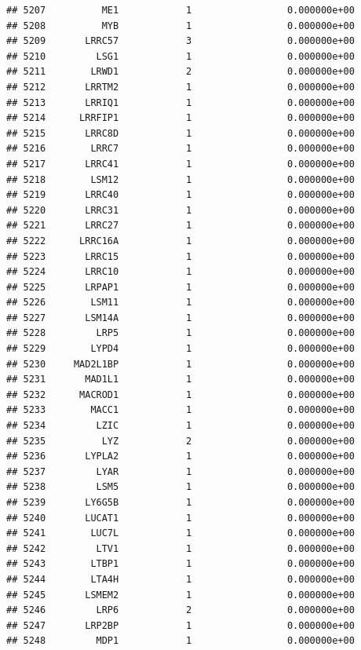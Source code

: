 \documentclass[
]{article}
\begin{document}
\begin{verbatim}
## 5207          ME1            1                 0.000000e+00
## 5208          MYB            1                 0.000000e+00
## 5209       LRRC57            3                 0.000000e+00
## 5210         LSG1            1                 0.000000e+00
## 5211        LRWD1            2                 0.000000e+00
## 5212       LRRTM2            1                 0.000000e+00
## 5213       LRRIQ1            1                 0.000000e+00
## 5214      LRRFIP1            1                 0.000000e+00
## 5215       LRRC8D            1                 0.000000e+00
## 5216        LRRC7            1                 0.000000e+00
## 5217       LRRC41            1                 0.000000e+00
## 5218        LSM12            1                 0.000000e+00
## 5219       LRRC40            1                 0.000000e+00
## 5220       LRRC31            1                 0.000000e+00
## 5221       LRRC27            1                 0.000000e+00
## 5222      LRRC16A            1                 0.000000e+00
## 5223       LRRC15            1                 0.000000e+00
## 5224       LRRC10            1                 0.000000e+00
## 5225       LRPAP1            1                 0.000000e+00
## 5226        LSM11            1                 0.000000e+00
## 5227       LSM14A            1                 0.000000e+00
## 5228         LRP5            1                 0.000000e+00
## 5229        LYPD4            1                 0.000000e+00
## 5230     MAD2L1BP            1                 0.000000e+00
## 5231       MAD1L1            1                 0.000000e+00
## 5232      MACROD1            1                 0.000000e+00
## 5233        MACC1            1                 0.000000e+00
## 5234         LZIC            1                 0.000000e+00
## 5235          LYZ            2                 0.000000e+00
## 5236       LYPLA2            1                 0.000000e+00
## 5237         LYAR            1                 0.000000e+00
## 5238         LSM5            1                 0.000000e+00
## 5239       LY6G5B            1                 0.000000e+00
## 5240       LUCAT1            1                 0.000000e+00
## 5241        LUC7L            1                 0.000000e+00
## 5242         LTV1            1                 0.000000e+00
## 5243        LTBP1            1                 0.000000e+00
## 5244        LTA4H            1                 0.000000e+00
## 5245       LSMEM2            1                 0.000000e+00
## 5246         LRP6            2                 0.000000e+00
## 5247       LRP2BP            1                 0.000000e+00
## 5248         MDP1            1                 0.000000e+00

\end{verbatim}
\end{document}
